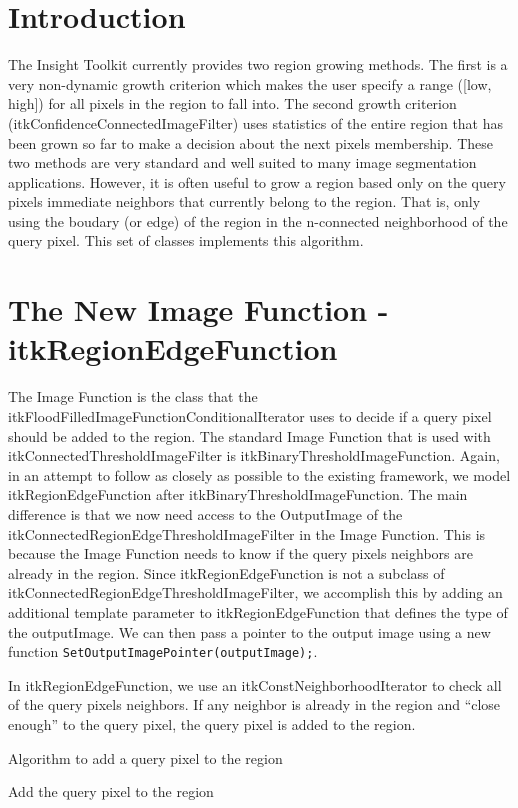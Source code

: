 \documentclass{InsightArticle}
\begin{document}
\section{Introduction}
The Insight Toolkit currently provides two region growing methods. The first is a very non-dynamic growth criterion which makes the user specify a range ([low, high]) for all pixels in the region to fall into. The second growth criterion (itkConfidenceConnectedImageFilter) uses statistics of the entire region that has been grown so far to make a decision about the next pixels membership. These two methods are very standard and well suited to many image segmentation applications. However, it is often useful to grow a region based only on the query pixels immediate neighbors that currently belong to the region. That is, only using the boudary (or edge) of the region in the n-connected neighborhood of the query pixel. This set of classes implements this algorithm.

\section{The New Image Function - itkRegionEdgeFunction}
The Image Function is the class that the itkFloodFilledImageFunctionConditionalIterator uses to decide if a query pixel should be added to the region. The standard Image Function that is used with itkConnectedThresholdImageFilter is itkBinaryThresholdImageFunction. Again, in an attempt to follow as closely as possible to the existing framework, we model itkRegionEdgeFunction after itkBinaryThresholdImageFunction. The main difference is that we now need access to the OutputImage of the itkConnectedRegionEdgeThresholdImageFilter in the Image Function. This is because the Image Function needs to know if the query pixels neighbors are already in the region. Since itkRegionEdgeFunction is not a subclass of itkConnectedRegionEdgeThresholdImageFilter, we accomplish this by adding an additional template parameter to itkRegionEdgeFunction that defines the type of the outputImage. We can then pass a pointer to the output image using a new function \verb|SetOutputImagePointer(outputImage);|.

In itkRegionEdgeFunction, we use an itkConstNeighborhoodIterator to check all of the query pixels neighbors. If any neighbor is already in the region and ``close enough'' to the query pixel, the query pixel is added to the region.

\begin{algorithm}
\label{alg:AddPixel}
\caption{Algorithm to add a query pixel to the region}
\begin{algorithmic}
\STATE Add the query pixel to the region
\ENDIF
\ENDIF
\ENDFOR
\end{algorithmic}
\end{algorithm}
\end{document}
